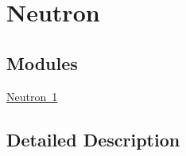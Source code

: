 \hypertarget{group___isotope_const-_neutron}{}\section{Neutron}
\label{group___isotope_const-_neutron}
\subsection*{Modules}
\begin{DoxyCompactItemize}
\item 
\mbox{\hyperlink{group___isotope_const-_neutron-n1}{Neutron 1}}
\end{DoxyCompactItemize}


\subsection{Detailed Description}

